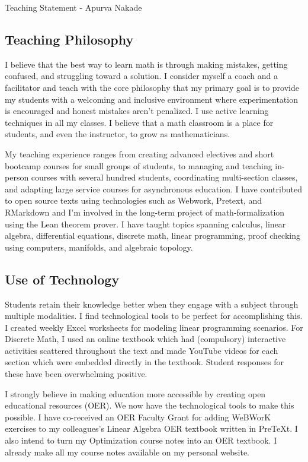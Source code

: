 \documentclass[10pt]{amsbook}
\begin{document}
\begin{center}
  \huge{Teaching Statement - Apurva Nakade}
\end{center}
\vspace{1em}

\subsection*{Teaching Philosophy}
  I believe that the best way to learn math is through making mistakes, getting confused, and struggling toward a solution. I consider myself a coach and a facilitator and teach with the core philosophy that my primary goal is to provide my students with a welcoming and inclusive environment where experimentation is encouraged and honest mistakes aren't penalized. 
  I use active learning techniques in all my classes. 
  I believe that a math classroom is a place for students, and even the instructor, to grow as mathematicians.

  My teaching experience ranges from creating advanced electives and short bootcamp courses for small groups of students, to managing and teaching in-person courses with several hundred students, coordinating multi-section classes, and adapting large service courses for asynchronous education. I have contributed to open source texts using technologies such as Webwork, Pretext, and RMarkdown and I'm involved in the long-term project of math-formalization using the Lean theorem prover. I have taught topics spanning calculus, linear algebra, differential equations, discrete math, linear programming, proof checking using computers, manifolds, and algebraic topology.

  \subsection*{Use of Technology}
  Students retain their knowledge better when they engage with a subject through multiple modalities. I find technological tools to be perfect for accomplishing this. I created weekly Excel worksheets for modeling linear programming scenarios. For Discrete Math, I used an online textbook which had (compulsory) interactive activities scattered throughout the text and made YouTube videos for each section which were embedded directly in the textbook. 
  Student responses for these have been overwhelming positive.

  I strongly believe in making education more accessible by creating open educational resources (OER). We now have the technological tools to make this possible. 
  I have co-received an OER Faculty Grant for adding WeBWorK exercises to my colleagues's Linear Algebra OER textbook written in PreTeXt. I also intend to turn my Optimization course notes into an OER textbook. I already make all my course notes available on my personal website.  
\end{document}
